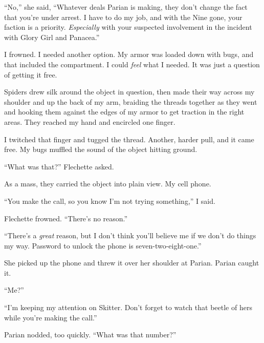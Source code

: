 ``No,'' she said, ``Whatever deals Parian is making, they don't change the fact that you're under arrest.  I have to do my job, and with the Nine gone, your faction is a priority.  \emph{Especially} with your suspected involvement in the incident with Glory Girl and Panacea.''



I frowned.  I needed another option.  My armor was loaded down with bugs, and that included the compartment.  I could \emph{feel} what I needed.  It was just a question of getting it free.



Spiders drew silk around the object in question, then made their way across my shoulder and up the back of my arm, braiding the threads together as they went and hooking them against the edges of my armor to get traction in the right areas.  They reached my hand and encircled one finger.



I twitched that finger and tugged the thread.  Another, harder pull, and it came free.   My bugs muffled the sound of the object hitting ground.



``What was that?'' Flechette asked.



As a mass, they carried the object into plain view.  My cell phone.



``You make the call, so you know I'm not trying something,'' I said.



Flechette frowned.  ``There's no reason.''



``There's a \emph{great} reason, but I don't think you'll believe me if we don't do things my way.  Password to unlock the phone is seven-two-eight-one.''



She picked up the phone and threw it over her shoulder at Parian.  Parian caught it.



``Me?''



``I'm keeping my attention on Skitter.  Don't forget to watch that beetle of hers while you're making the call.''



Parian nodded, too quickly.  ``What was that number?''



